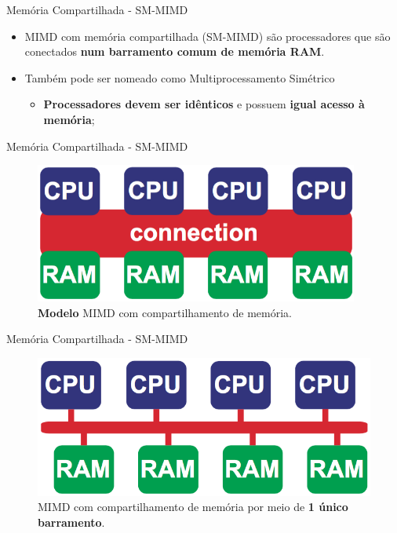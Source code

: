 \begin{frame}{Memória Compartilhada - SM-MIMD}
	\begin{itemize}
		\item MIMD com memória compartilhada (SM-MIMD) são processadores que são conectados \textbf{num barramento comum de memória RAM}.
		\item Também pode ser nomeado como Multiprocessamento Simétrico
		\begin{itemize}
			\item \textbf{Processadores devem ser idênticos} e possuem \textbf{igual acesso à memória};
		\end{itemize}

	\end{itemize}

\end{frame}


\begin{frame}{Memória Compartilhada - SM-MIMD}
    \begin{figure}[h]
    	\centering
    	\includegraphics[width=0.95\textwidth]{img/tobias/sm-mimd.png}
    	\caption{\textbf{Modelo} MIMD com compartilhamento de memória.}
    	\label{fig:sm-mimd}
    \end{figure}

\end{frame}


\begin{frame}{Memória Compartilhada - SM-MIMD}
    \begin{figure}[h]
    	\centering
    	\includegraphics[width=1\textwidth]{img/tobias/sm-mimd2.png}
    	\caption{MIMD com compartilhamento de memória por meio de {\bf 1 único barramento}.}
    	\label{fig:sm-mimd2}
    \end{figure}

\end{frame}


